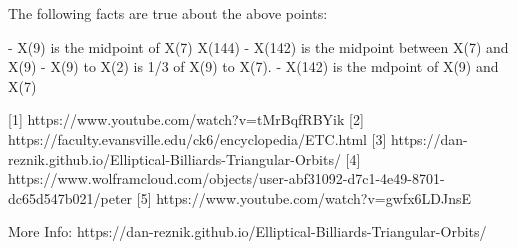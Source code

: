 The following facts are true about the above points:

- X(9) is the midpoint of X(7) X(144)
- X(142) is the midpoint between X(7) and X(9)
- X(9) to X(2) is 1/3 of X(9) to X(7).
- X(142) is the mdpoint of X(9) and X(7)

[1] https://www.youtube.com/watch?v=tMrBqfRBYik
[2] https://faculty.evansville.edu/ck6/encyclopedia/ETC.html
[3] https://dan-reznik.github.io/Elliptical-Billiards-Triangular-Orbits/
[4] https://www.wolframcloud.com/objects/user-abf31092-d7c1-4e49-8701-dc65d547b021/peter%
[5] https://www.youtube.com/watch?v=gwfx6LDJnsE

More Info: https://dan-reznik.github.io/Elliptical-Billiards-Triangular-Orbits/